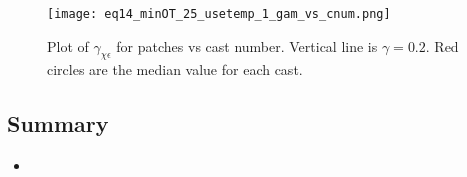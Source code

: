 \documentclass[11pt]{article}
\begin{document}
\begin{figure}[htbp]
\texttt{[image: eq14\_minOT\_25\_usetemp\_1\_gam\_vs\_cnum.png]}
\caption{Plot of $\gamma_{\chi\epsilon}$ for patches vs cast number. Vertical line is $\gamma=0.2$. Red circles are the median value for each cast.}
\label{gamvscnum}
\end{figure}




\clearpage
\subsection{Summary}

\begin{itemize}
\item 
\end{itemize}
\end{document}
